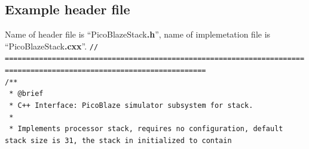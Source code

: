 \documentclass[a4paper,twoside,15pt]{book}
\begin{document}
        \subsection{Example header file}
            Name of header file is ``PicoBlazeStack\textbf{.h}'', name of implemetation file is ``PicoBlazeStack\textbf{.cxx}''.
            {\fontsize{7pt}{8pt} \selectfont{}
            {\color{highlight_c_comment}\verb'// ====================================================================================================================='}\\
            {\color{highlight_c_dox_comment}\verb'/**'}\\
            \verb' '{\color{highlight_c_dox_comment}\verb'*'}\verb' '{\color{highlight_c_dox_tag}\verb'@brief'}\\
            \verb' '{\color{highlight_c_dox_comment}\verb'*'}\verb' '{\color{highlight_c_dox_comment}\verb'C++'}\verb' '{\color{highlight_c_dox_comment}\verb'Interface:'}\verb' '{\color{highlight_c_dox_comment}\verb'PicoBlaze'}\verb' '{\color{highlight_c_dox_comment}\verb'simulator'}\verb' '{\color{highlight_c_dox_comment}\verb'subsystem'}\verb' '{\color{highlight_c_dox_comment}\verb'for'}\verb' '{\color{highlight_c_dox_comment}\verb'stack.'}\\
            \verb' '{\color{highlight_c_dox_comment}\verb'*'}\\
            \verb' '{\color{highlight_c_dox_comment}\verb'*'}\verb' '{\color{highlight_c_dox_comment}\verb'Implements'}\verb' '{\color{highlight_c_dox_comment}\verb'processor'}\verb' '{\color{highlight_c_dox_comment}\verb'stack,'}\verb' '{\color{highlight_c_dox_comment}\verb'requires'}\verb' '{\color{highlight_c_dox_comment}\verb'no'}\verb' '{\color{highlight_c_dox_comment}\verb'configuration,'}\verb' '{\color{highlight_c_dox_comment}\verb'default'}\verb' '{\color{highlight_c_dox_comment}\verb'stack'}\verb' '{\color{highlight_c_dox_comment}\verb'size'}\verb' '{\color{highlight_c_dox_comment}\verb'is'}\verb' '{\color{highlight_c_dox_comment}\verb'31,'}\verb' '{\color{highlight_c_dox_comment}\verb'the'}\verb' '{\color{highlight_c_dox_comment}\verb'stack'}\verb' '{\color{highlight_c_dox_comment}\verb'in'}\verb' '{\color{highlight_c_dox_comment}\verb'initialized'}\verb' '{\color{highlight_c_dox_comment}\verb'to'}\verb' '{\color{highlight_c_dox_comment}\verb'contain'}\\
}
\end{document}
